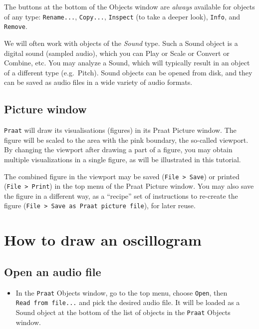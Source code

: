 \documentclass[
]{book}
\providecommand{\tightlist}{%
  \setlength{\itemsep}{0pt}\setlength{\parskip}{0pt}}
\begin{document}
The buttons at the bottom of the Objects window are \emph{always} available for objects of any type: \texttt{Rename...}, \texttt{Copy...}, \texttt{Inspect} (to take a deeper look), \texttt{Info}, and \texttt{Remove}.

We will often work with objects of the \emph{Sound} type. Such a Sound object is a digital sound (sampled audio), which you can Play or Scale or Convert or Combine, etc. You may analyze a Sound, which will typically result in an object of a different type (e.g.~Pitch). Sound objects can be opened from disk, and they can be saved as audio files in a wide variety of audio formats.

\subsection*{Picture window}\label{picture-window}

\texttt{Praat} will draw its visualisations (figures) in its Praat Picture window. The figure will be scaled to the area with the pink boundary, the so-called viewport. By changing the viewport after drawing a part of a figure, you may obtain multiple visualizations in a single figure, as will be illustrated in this tutorial.

The combined figure in the viewport may be saved (\texttt{File\ \textgreater{}\ Save}) or printed (\texttt{File\ \textgreater{}\ Print}) in the top menu of the Praat Picture window.
You may also save the figure in a different way, as a ``recipe'' set of instructions to re-create the figure (\texttt{File\ \textgreater{}\ Save\ as\ Praat\ picture\ file}), for later reuse.

\label{box-open}
\section{How to draw an oscillogram}\label{how-to-draw-an-oscillogram}

\subsection{Open an audio file}\label{open-an-audio-file}

\begin{itemize}
\tightlist
\item
  In the \texttt{Praat} Objects window, go to the top menu, choose \texttt{Open}, then \texttt{Read\ from\ file...} and pick the desired audio file. It will be loaded as a Sound object at the bottom of the list of objects in the \texttt{Praat} Objects window.
\end{itemize}
\end{document}
